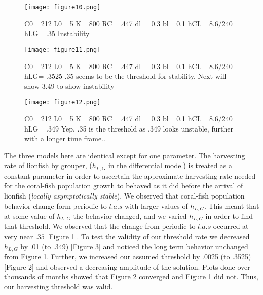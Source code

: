 \documentclass[11pt]{article}
\begin{document}
\begin{figure}[p]
\centering
\texttt{[image: figure10.png]}
\caption{
C0= 212
L0= 5
K= 800
RC=  .447
dl = 0.3
bl= 0.1
hCL=    8.6/240
hLG=  .35
Instability}
\end{figure}


\begin{figure}[p]
\centering
\texttt{[image: figure11.png]}
\caption{
C0= 212
L0= 5
K= 800
RC=  .447
dl = 0.3
bl= 0.1
hCL=    8.6/240
hLG=  .3525
.35 seems to be the threshold for stability. Next will show 3.49 to show instability}
\end{figure}




\begin{figure}[p]
\centering
\texttt{[image: figure12.png]}
\caption{
C0= 212
L0= 5
K= 800
RC=  .447
dl = 0.3
bl= 0.1
hCL=    8.6/240
hLG=  .349
Yep. .35 is the threshold as .349 looks unstable, further with a longer time frame..}
\end{figure}

The three models here are identical except for one parameter. The harvesting rate of lionfish by grouper, ($h_{L,G}$ in the differential model)  is treated as a constant parameter in order to ascertain the approximate harvesting rate needed for the coral-fish population growth to behaved as it did before the arrival of lionfish ({\it locally asymptotically stable}). We observed that coral-fish population behavior change form periodic to $l.a.s$ with larger values of $h_{L,G}$.  This meant that at some value of $h_{L,G}$ the behavior changed, and we varied $h_{L,G}$ in order to find that threshold.  We observed that the change from periodic to $l.a.s$ occurred at very near $.35$ [Figure 1]. To test the validity of our threshold rate we decreased $h_{L,G}$ by .01 (to .349) [Figure 3] and noticed the long term behavior unchanged from Figure 1. Further, we increased our assumed threshold by .0025 (to .3525)[Figure 2] and observed a decreasing amplitude of the solution. Plots done over thousands of months showed that Figure 2 converged and Figure 1 did not. Thus, our harvesting threshold was valid. 
\end{document}

